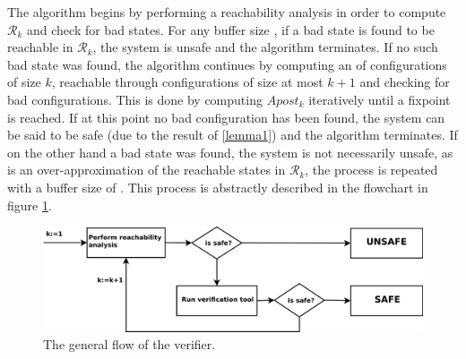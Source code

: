 The algorithm begins by performing a reachability analysis in order to compute $\mathcal{R}_k$ and check for bad states. For any buffer size , if a bad state is found to be reachable in $\mathcal{R}_k$, the system is unsafe and the algorithm terminates. If no such bad state was found, the algorithm continues by computing an  of configurations of size $k$, reachable through configurations of size at most $k+1$ and checking for bad configurations. This is done by computing $Apost_k$ iteratively until a fixpoint  is reached. If at this point no bad configuration has been found, the system can be said to be safe (due to the result of \ref{lemma1}) and the algorithm terminates. If on the other hand a bad state was found, the system is not necessarily unsafe, as  is an over-approximation of the reachable states in $\mathcal{R}_k$, the process is repeated with a buffer size of . This process is abstractly described in the flowchart in figure \ref{flow}.

\begin{figure}
\includegraphics[width=400pt] {bilder/flowchart.png}
\caption{The general flow of the verifier.}
\label{flow}
\end{figure}
